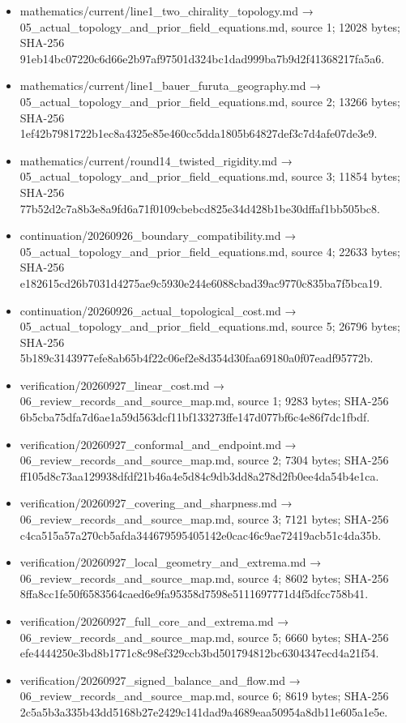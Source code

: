 \documentclass[
  10pt,
]{article}
\begin{document}
\begin{itemize}
  mathematics/current/line1\_energy\_envelope\_gap.md →
  04\_analytic\_foundations.md, source 5; 10305 bytes; SHA-256
  8cd0c429b2f403b1c31bb24333efc7397afba5742394a2951dd56aa5e24c3ad4.
\item
  mathematics/current/line1\_two\_chirality\_topology.md →
  05\_actual\_topology\_and\_prior\_field\_equations.md, source 1; 12028
  bytes; SHA-256
  91eb14bc07220c6d66e2b97af97501d324bc1dad999ba7b9d2f41368217fa5a6.
\item
  mathematics/current/line1\_bauer\_furuta\_geography.md →
  05\_actual\_topology\_and\_prior\_field\_equations.md, source 2; 13266
  bytes; SHA-256
  1ef42b7981722b1ec8a4325e85e460cc5dda1805b64827def3c7d4afe07de3e9.
\item
  mathematics/current/round14\_twisted\_rigidity.md →
  05\_actual\_topology\_and\_prior\_field\_equations.md, source 3; 11854
  bytes; SHA-256
  77b52d2c7a8b3e8a9fd6a71f0109cbebcd825e34d428b1be30dffaf1bb505bc8.
\item
  continuation/20260926\_boundary\_compatibility.md →
  05\_actual\_topology\_and\_prior\_field\_equations.md, source 4; 22633
  bytes; SHA-256
  e182615cd26b7031d4275ae9c5930e244e6088cbad39ac9770c835ba7f5bca19.
\item
  continuation/20260926\_actual\_topological\_cost.md →
  05\_actual\_topology\_and\_prior\_field\_equations.md, source 5; 26796
  bytes; SHA-256
  5b189c3143977efe8ab65b4f22c06ef2e8d354d30faa69180a0f07eadf95772b.
\item
  verification/20260927\_linear\_cost.md →
  06\_review\_records\_and\_source\_map.md, source 1; 9283 bytes;
  SHA-256
  6b5cba75dfa7d6ae1a59d563dcf11bf133273ffe147d077bf6c4e86f7dc1fbdf.
\item
  verification/20260927\_conformal\_and\_endpoint.md →
  06\_review\_records\_and\_source\_map.md, source 2; 7304 bytes;
  SHA-256
  ff105d8c73aa129938dfdf21b46a4e5d84c9db3dd8a278d2fb0ee4da54b4e1ca.
\item
  verification/20260927\_covering\_and\_sharpness.md →
  06\_review\_records\_and\_source\_map.md, source 3; 7121 bytes;
  SHA-256
  c4ca515a57a270cb5afda344679595405142e0cac46c9ae72419acb51c4da35b.
\item
  verification/20260927\_local\_geometry\_and\_extrema.md →
  06\_review\_records\_and\_source\_map.md, source 4; 8602 bytes;
  SHA-256
  8ffa8cc1fe50f6583564caed6e9fa95358d7598e5111697771d4f5dfcc758b41.
\item
  verification/20260927\_full\_core\_and\_extrema.md →
  06\_review\_records\_and\_source\_map.md, source 5; 6660 bytes;
  SHA-256
  efe4444250e3bd8b1771c8c98ef329ccb3bd501794812bc6304347ecd4a21f54.
\item
  verification/20260927\_signed\_balance\_and\_flow.md →
  06\_review\_records\_and\_source\_map.md, source 6; 8619 bytes;
  SHA-256
  2c5a5b3a335b43dd5168b27e2429c141dad9a4689eaa50954a8db11e605a1e5e.
\end{itemize}
\end{document}
